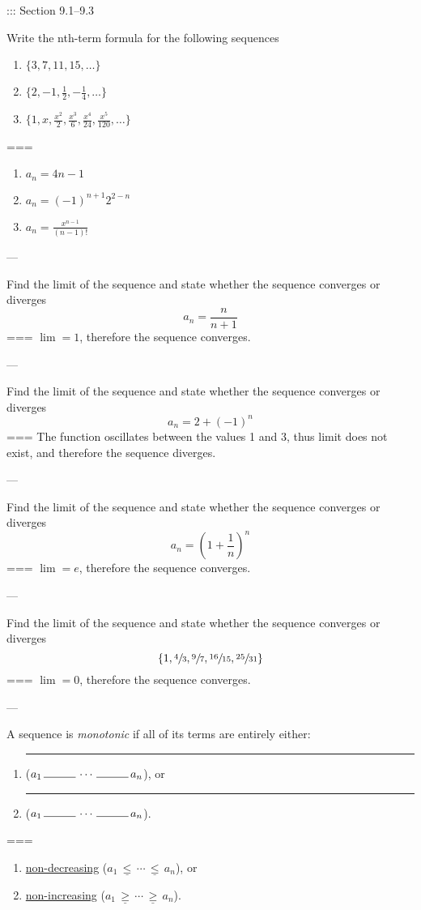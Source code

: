 ::: Section 9.1--9.3

Write the nth-term formula for the following sequences
\begin{enumerate}
\item \(\{3,7,11,15,\dots\}\)
\item \(\{2,-1,\frac{1}{2},-\frac{1}{4},\dots\}\)
\item \(\{1,x,\frac{x^2}{2},\frac{x^3}{6},\frac{x^4}{24},\frac{x^5}{120},\dots\}\)
\end{enumerate}
===
\begin{enumerate}
\item\(a_n=4n-1\)
\item\(a_n={(-1)}^{n+1}2^{2-n}\)
\item\(a_n=\frac{x^{n-1}}{(n-1)!}\)
\end{enumerate}

---

Find the limit of the sequence and state whether the sequence converges or
diverges
\[a_n=\frac{n}{n+1}\]
===
\(\lim=1\), therefore the sequence converges.

---

Find the limit of the sequence and state whether the sequence converges or
diverges
\[a_n=2+{(-1)}^n\]
===
The function oscillates between the values 1 and 3, thus limit does not
exist, and therefore the sequence diverges.

---

Find the limit of the sequence and state whether the sequence converges or
diverges
\[a_n={\left(1+\frac{1}{n}\right)}^n\]
===
\(\lim=e\), therefore the sequence converges.

---

Find the limit of the sequence and state whether the sequence converges or
diverges
\[\left\{1,\sfrac{4}{3},\sfrac{9}{7},\sfrac{16}{15},\sfrac{25}{31}\right\}\]
===
\(\lim=0\), therefore the sequence converges.

---

A sequence is \textit{monotonic} if all of its terms are entirely either:
\begin{enumerate}
  \item \rule{1cm}{0.15mm}
    (\(a_1\,\rule{1cm}{0.15mm}\,\cdots\,\rule{1cm}{0.15mm}\,a_n\)), or
  \item \rule{1cm}{0.15mm}
    (\(a_1\,\rule{1cm}{0.15mm}\,\cdots\,\rule{1cm}{0.15mm}\,a_n\)).
\end{enumerate}
===
\begin{enumerate}
  \item \underline{non-decreasing}
    (\(a_1\,\underline{\leq}\,\cdots\,\underline{\leq}\,a_n\)), or
  \item \underline{non-increasing}
    (\(a_1\,\underline{\geq}\,\cdots\,\underline{\geq}\,a_n\)).
\end{enumerate}

